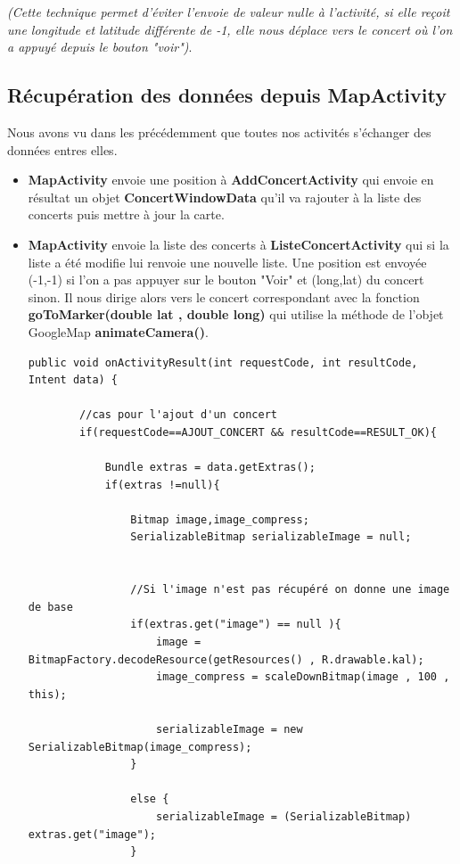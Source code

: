 \documentclass{article}
\begin{document}
\textit{(Cette technique permet d'éviter l'envoie de valeur nulle à l'activité, si elle reçoit une longitude et latitude différente de -1, elle nous déplace vers le concert où l'on a appuyé depuis le bouton "voir")}.

\subsection{Récupération des données depuis MapActivity}

Nous avons vu dans les précédemment que toutes nos activités s'échanger des données entres elles. 
\begin{itemize}
\item \textbf{MapActivity} envoie une position à \textbf{AddConcertActivity} qui envoie en résultat un objet \textbf{ConcertWindowData} qu'il va rajouter à la liste des concerts puis mettre à jour la carte.
\item \textbf{MapActivity} envoie la liste des concerts à \textbf{ListeConcertActivity} qui si la liste a été modifie lui renvoie une nouvelle liste. Une position est envoyée (-1,-1) si l'on a pas appuyer sur le bouton "Voir" et (long,lat) du concert sinon. Il nous dirige alors vers le concert correspondant avec la fonction \textbf{goToMarker(double lat , double long)} qui utilise la méthode de l'objet GoogleMap \textbf{animateCamera()}.

\begin{verbatim}
public void onActivityResult(int requestCode, int resultCode, Intent data) {
		
		//cas pour l'ajout d'un concert
        if(requestCode==AJOUT_CONCERT && resultCode==RESULT_OK){

            Bundle extras = data.getExtras();
            if(extras !=null){

                Bitmap image,image_compress;
                SerializableBitmap serializableImage = null;


                //Si l'image n'est pas récupéré on donne une image de base
                if(extras.get("image") == null ){
                    image = BitmapFactory.decodeResource(getResources() , R.drawable.kal);
                    image_compress = scaleDownBitmap(image , 100 , this);

                    serializableImage = new SerializableBitmap(image_compress);
                }

                else {
                    serializableImage = (SerializableBitmap) extras.get("image");
                }


\end{verbatim}
\end{itemize}
\end{document}
